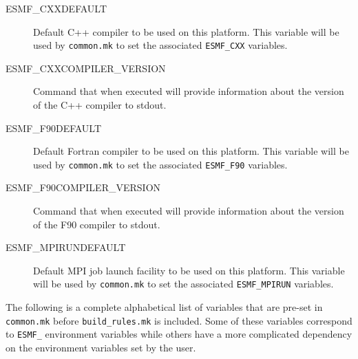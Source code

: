 \begin{description}

\item[ESMF\_CXXDEFAULT]
Default C++ compiler to be used on this platform. This variable will be used
by {\tt common.mk} to set the associated {\tt ESMF\_CXX} variables.
\item[ESMF\_CXXCOMPILER\_VERSION]
Command that when executed will provide information about the version of the
C++ compiler to stdout.
\item[ESMF\_F90DEFAULT]
Default Fortran compiler to be used on this platform. This variable will be used
by {\tt common.mk} to set the associated {\tt ESMF\_F90} variables.
\item[ESMF\_F90COMPILER\_VERSION]
Command that when executed will provide information about the version of the
F90 compiler to stdout.
\item[ESMF\_MPIRUNDEFAULT]
Default MPI job launch facility to be used on this platform. This variable will
be used by {\tt common.mk} to set the associated {\tt ESMF\_MPIRUN} variables.

\end{description}

The following is a complete alphabetical list of variables that are pre-set 
in {\tt common.mk} before {\tt build\_rules.mk} is included. Some of these
variables correspond to {\tt ESMF\_} environment variables while others have 
a more complicated dependency on the environment variables set by the user.

